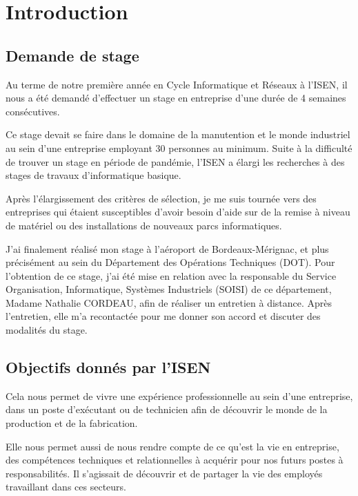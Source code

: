 \chapter{Introduction}


\section{Demande de stage}


Au terme de notre première année en Cycle Informatique et Réseaux à l’ISEN, il nous a été demandé d’effectuer un stage en entreprise d’une durée de 4 semaines consécutives.


Ce stage devait se faire dans le domaine de la manutention et le monde industriel au sein d’une entreprise employant 30 personnes au minimum. Suite à la difficulté de trouver un stage en période de pandémie, l’ISEN a élargi les recherches à des stages de travaux d’informatique basique.\newline


Après l'élargissement des critères de sélection, je me suis tournée vers des entreprises qui étaient susceptibles d'avoir besoin d’aide sur de la remise à niveau de matériel ou des installations de nouveaux parcs informatiques.


J’ai finalement réalisé mon stage à l’aéroport de Bordeaux-Mérignac, et plus précisément au sein du Département des Opérations Techniques (DOT). Pour l’obtention de ce stage, j’ai été mise en relation avec la responsable du Service Organisation, Informatique, Systèmes Industriels (SOISI) de ce département, Madame Nathalie CORDEAU, afin de réaliser un entretien à distance. Après l’entretien, elle m'a recontactée pour me donner son accord et discuter des modalités du stage.


\section{Objectifs donnés par l'ISEN}

Cela nous permet de vivre une expérience professionnelle au sein d’une entreprise, dans un poste d’exécutant ou de technicien afin de découvrir le monde de la production et de la fabrication.

Elle nous permet aussi de nous rendre compte de ce qu'est la vie en entreprise, des compétences techniques et relationnelles à acquérir pour nos futurs postes à responsabilités. Il s'agissait de découvrir et de partager la vie des employés travaillant dans ces secteurs.

